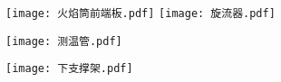 
\label{chap:manufac}

\begin{figure}[htbp!]
	\centering
	\texttt{[image: 火焰筒前端板.pdf]}
	\texttt{[image: 旋流器.pdf]}
\end{figure}
\begin{figure}[htbp!]
	\centering
	\texttt{[image: 测温管.pdf]}
\end{figure}

\begin{figure}[htbp!]
	\centering
	\texttt{[image: 下支撑架.pdf]}
\end{figure}
